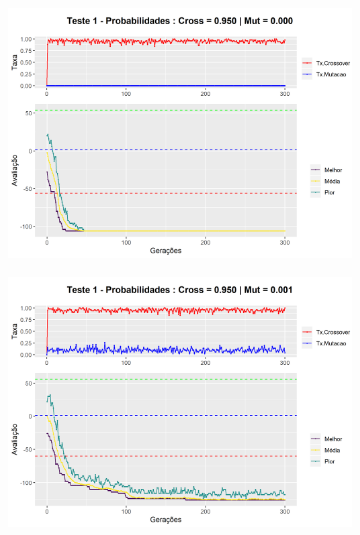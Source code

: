 \begin{figure}[h!]
	\centering
	\begin{subfigure}[b]{0.47\linewidth}
		\includegraphics[width=\linewidth]{imagens/graph_pc_0_950_pm_0_000_pop_50_g_300__1.png}
		\caption{}
	\end{subfigure}
	\begin{subfigure}[b]{0.47\linewidth}
		\includegraphics[width=\linewidth]{imagens/graph_pc_0_950_pm_0_001_pop_50_g_300__1.png}
		\caption{}
	\end{subfigure}
	\begin{subfigure}[b]{0.47\linewidth}

\end{subfigure}
\end{figure}
